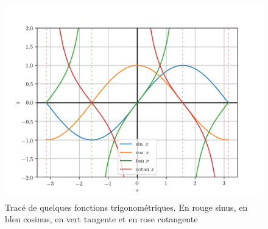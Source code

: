 \begin{figure}
    \centering
    \includegraphics[scale=0.8]{trig.png}
    \caption[Tracé de quelques fonctions trigonométriques]{Tracé de quelques 
        fonctions trigonométriques. En rouge sinus, en bleu cosinus, en vert 
    tangente et en rose cotangente}
    \label{fig:tracetrigo}
\end{figure}
